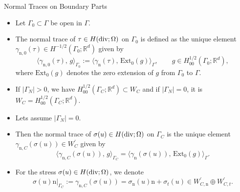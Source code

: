 \documentclass[10pt,aspectratio=169]{beamer}
\def\R{{\mathbb R}}
\newcommand{\diver}{\operatornamewithlimits{div}}
\begin{document}
\begin{frame}{Normal Traces on Boundary Parts}
	\begin{itemize}
		\item Let $\Gamma_0\subset\Gamma$ be open in $\Gamma$.
		\item The normal trace of $\tau\in H(\diver;\Omega)$ on $\Gamma_0$ is defined as the unique element $\gamma_{\mathrm{n},0}(\tau)\in H^{-1/2}(\Gamma_0;\R^d)$ given by
		      \begin{equation*}
			      \langle \gamma_{\mathrm{n},0}(\tau),\,g\rangle_{\Gamma_0}
			      :=
			      \langle \gamma_{\mathrm{n}}(\tau),\,\mathrm{Ext}_0 (g)\rangle_{\Gamma},
			      \qquad g\in H^{1/2}_{00}(\Gamma_0;\R^d),
		      \end{equation*}
		      where $\mathrm{Ext}_0 (g)$ denotes the zero extension of $g$ from $\Gamma_0$ to $\Gamma$.
		\item If $|\Gamma_N|>0$, we have $H_{00}^{1/2}(\Gamma_C;\R^d)\subset W_C$ and if $|\Gamma_N|=0$, it is $W_C = H_{00}^{1/2}(\Gamma_C;\R^d)$.
		\item Lets assume $|\Gamma_N|=0$.
		\item Then the normal trace of $\sigma(u)\in H(\diver;\Omega)$ on $\Gamma_C$ is the unique element $\gamma_{\mathrm{n},C}(\sigma(u))\in W_C^\prime$ given by
		      \begin{equation*}
			      \langle \gamma_{\mathrm{n},C}(\sigma(u)),\,g\rangle_{\Gamma_C} = \langle \gamma_\mathrm{n}(\sigma(u)),\, \mathrm{Ext}_0(g)\rangle_\Gamma.
		      \end{equation*}
		\item For the stress $\sigma(u)\in H(\diver;\Omega)$, we denote
		      \begin{equation*}
			      \sigma(u)\mathrm{n}|_{\Gamma_C}:=\gamma_{\mathrm{n},C}(\sigma(u)) = \sigma_\mathrm{n}(u)\mathrm{n}+\sigma_t(u)\in W_{C,\mathrm{n}}^\prime\oplus W^\prime_{C,t}.
		      \end{equation*}
	\end{itemize}
\end{frame}
\end{document}
